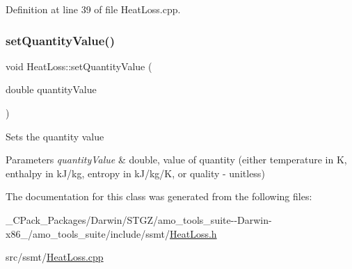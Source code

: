 Definition at line 39 of file Heat\+Loss.\+cpp.

\mbox{\label{class_heat_loss_ae6b6c4ac28471d7bc94e3886c48a90bd}} 
\subsubsection{\texorpdfstring{set\+Quantity\+Value()}{setQuantityValue()}\hspace{0.1cm}{\footnotesize\ttfamily [3/3]}}
{\footnotesize\ttfamily void Heat\+Loss\+::set\+Quantity\+Value (\begin{DoxyParamCaption}\item[{double}]{quantity\+Value }\end{DoxyParamCaption})}

Sets the quantity value 
\begin{DoxyParams}{Parameters}
{\em quantity\+Value} & double, value of quantity (either temperature in K, enthalpy in k\+J/kg, entropy in k\+J/kg/K, or quality -\/ unitless) \\
\hline
\end{DoxyParams}


The documentation for this class was generated from the following files\+:\begin{DoxyCompactItemize}
\item 
\+\_\+\+C\+Pack\+\_\+\+Packages/\+Darwin/\+S\+T\+G\+Z/amo\+\_\+tools\+\_\+suite-\/-\/\+Darwin-\/x86\+\_/amo\+\_\+tools\+\_\+suite/include/ssmt/\hyperlink{___c_pack___packages_2_darwin_2_s_t_g_z_2amo__tools__suite--_darwin-x86__64_2amo__tools__suite_2include_2ssmt_2_heat_loss_8h}{Heat\+Loss.\+h}\item 
src/ssmt/\hyperlink{_heat_loss_8cpp}{Heat\+Loss.\+cpp}\end{DoxyCompactItemize}
